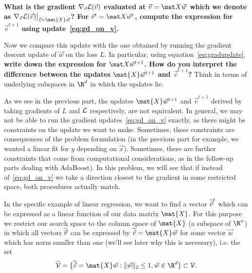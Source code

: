\documentclass[preview]{standalone}
\begin{document}
\begin{Parts}

    
    {\bf What is the gradient $\nabla_{\vec v} \mathcal{L}(\vec v)$
      evaluated at $\vec v = \mat X \vec w$ which we denote as
      $\nabla_{\vec v} \Loss(\vec v)\big\vert_{\vec v =
        \mat{X}\vec{w}}$?  For $\vec v^t = \mat X \vec w^t$, compute
      the expression for $\vec v^{t+1}$ using
      update~\eqref{eq:gd_on_v}.}

  Now we compare this update with the one obtained by running the
  gradient descent update of $\vec{w}$ on the loss $L$. In particular,
  using equation~\eqref{eq:gradupdate}, {\bf write down the expression
    for $\mat X \vec w^{t+1}$.
            How do you interpret the difference between the updates $\mat{X} \vec{w}^{t+1}$  and $\vec{v}^{t+1}$?} Think in terms of underlying subspaces in $\R^d$ in which the updates lie.


                            



\Part As we see in the previous part, the updates
  $\mat{X}\vec{w}^{t+1}$ and $\vec{v}^{t+1}$ derived by taking
gradients of $L$ and $\mathcal{L}$ respectively, are not equivalent.  In
general, we may not be able to run the gradient
updates~\eqref{eq:gd_on_v} exactly, as there might be constraints on
the update we want to make. Sometimes, these constraints are
consequences of the problem formulation (in the previous part for
example, we wanted a linear fit for $y$ depending on
$\vec{x}$). Sometimes, there are further constraints that come from
computational considerations, as in the follow-up parts dealing with
AdaBoost). In this problem, we will see that if instead
of~\eqref{eq:gd_on_v} we take a direction closest to the gradient in
some restricted space, both procedures actually match.

  In the specific example of linear regression, we want
  to find a vector $\widetilde{\vec{v}}^t$ which can be expressed as a linear
  function of our data matrix $\mat{X}$. For this purpose we restrict our
  search space to the column space of $\mat{X}$ (a subspace of $\R^n$)
  in which all vectors $\widetilde{\vec{v}}$ can be expressed by $\tilvecv
  =\mat{X}\vec{w}$ for some vector $\vec{w}$ which has norm smaller than one (we'll see later why this is necessary), i.e. the set
  \begin{equation*}
  \widetilde{\Vspace} = \{\tilvecv = \mat{X}\vec{w}: \|\vec{w}\|_2 \leq 1, \vec{w} \in \R^d \} \subset \Vspace.
\end{equation*}


\end{Parts}
\end{document}
